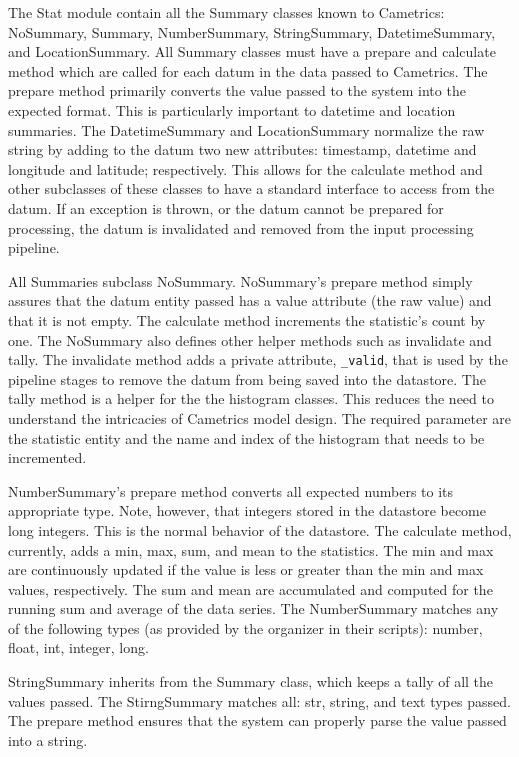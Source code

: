 \documentclass[10pt,a4paper,english]{article}
\begin{document}
The Stat module contain all the Summary classes known to Cametrics: NoSummary, Summary, NumberSummary, StringSummary, DatetimeSummary, and LocationSummary. All Summary classes must have a prepare and calculate method which are called for each datum in the data passed to Cametrics. The prepare method primarily converts the value passed to the system into the expected format. This is particularly important to datetime and location summaries. The DatetimeSummary and LocationSummary normalize the raw string by adding to the datum two new attributes: timestamp, datetime and longitude and latitude; respectively. This allows for the calculate method and other subclasses of these classes to have a standard interface to access from the datum. If an exception is thrown, or the datum cannot be prepared for processing, the datum is invalidated and removed from the input processing pipeline.

All Summaries subclass NoSummary. NoSummary's prepare method simply assures that the datum entity passed has a value attribute (the raw value) and that it is not empty. The calculate method increments the statistic's count by one. The NoSummary also defines other helper methods such as invalidate and tally. The invalidate method adds a private attribute, \texttt{{\_}valid}, that is used by the pipeline stages to remove the datum from being saved into the datastore. The tally method is a helper for the the histogram classes. This reduces the need to understand the intricacies of Cametrics model design. The required parameter are the statistic entity and the name and index of the histogram that needs to be incremented.

NumberSummary's prepare method converts all expected numbers to its appropriate type. Note, however, that integers stored in the datastore become long integers. This is the normal behavior of the datastore. The calculate method, currently, adds a min, max, sum, and mean to the statistics. The min and max are continuously updated if the value is less or greater than the min and max values, respectively. The sum and mean are accumulated and computed for the running sum and average of the data series. The NumberSummary matches any of the following types (as provided by the organizer in their scripts): number, float, int, integer, long.

StringSummary inherits from the Summary class, which keeps a tally of all the values passed. The StirngSummary matches all: str, string, and text types passed. The prepare method ensures that the system can properly parse the value passed into a string.
\end{document}
